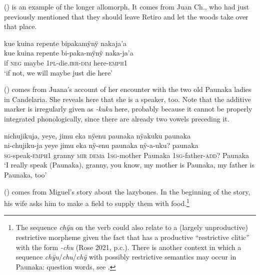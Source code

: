 () is an example of the longer allomorph. It comes from Juan Ch., who had just previously mentioned that they should leave Retiro and let the woods take over that place.

\ea\label{ex:emphi-1}
\begingl
\glpreamble kue kuina repente bipakamÿnÿ nakaja’a\\
\gla kue kuina repente bi-paka-mÿnÿ naka-ja’a\\
\glb if \textsc{neg} maybe 1\textsc{pl}-die.\textsc{irr}-\textsc{dim} here-\textsc{emph}1\\
\glft ‘if not, we will maybe just die here’
\endgl
\trailingcitation{[nxx-p630101g-1.123]}
\xe


() comes from Juana’s account of her encounter with the two old Paunaka ladies in Candelaria. She reveals here that she is a speaker, too. Note that the additive marker is irregularly given as \textit{-kuku} here, probably because it cannot be properly integrated phonologically, since there are already two vowels preceding it.

\ea\label{ex:emphi-2}
\begingl
\glpreamble nichujikuja, yeye, jimu eka nÿenu paunaka nÿakuku paunaka\\
\gla ni-chujiku-ja yeye jimu eka nÿ-enu paunaka nÿ-a-uku? paunaka\\
\textsc{sg}-speak-\textsc{emph}1 granny \textsc{mir} \textsc{dem}a 1\textsc{sg}-mother Paunaka 1\textsc{sg}-father-\textsc{add}? Paunaka\\
\glft ‘I really speak (Paunaka), granny, you know, my mother is Paunaka, my father is Paunaka, too’
\endgl
\trailingcitation{[jxx-p120515l-1.161]}
\xe

() comes from Miguel’s story about the lazybones. In the beginning of the story, his wife asks him to make a field to supply them with food.\footnote{The sequence \textit{chÿu} on the verb could also relate to a (largely unproductive) restrictive morpheme given the fact that  has a productive “restrictive clitic” with the form \textit{-chu} (Rose 2021, p.c.). There is another context in which a sequence \textit{chÿu}/\textit{chu}/\textit{chÿ} with possibly restrictive semantics may occur in Paunaka: question words, see .}

